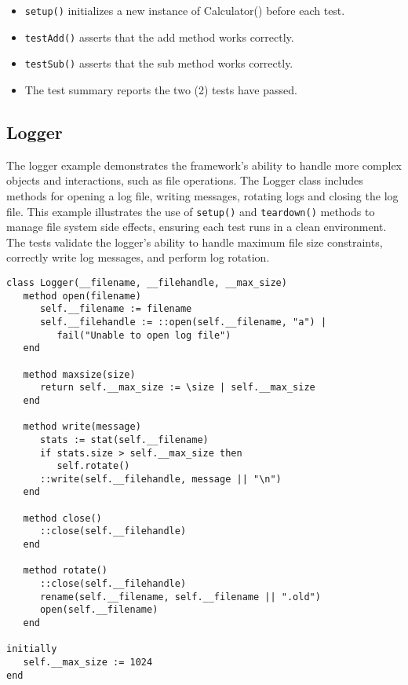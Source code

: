 \documentclass[letterpaper,12pt]{article}
\begin{document}
\begin{itemize}
   \item \texttt{setup()} initializes a new instance of Calculator() before each test.
   \item \texttt{testAdd()} asserts that the add method works correctly.
   \item \texttt{testSub()} asserts that the sub method works correctly.
   \item The test summary reports the two (2) tests have passed.
\end{itemize}

\newpage\subsection{Logger}

The logger example demonstrates the framework's ability to handle more complex objects and interactions, such as file operations. The Logger class includes methods for opening a log file, writing messages, rotating logs and closing the log file. This example illustrates the use of \texttt{setup()} and \texttt{teardown()} methods to manage file system side effects, ensuring each test runs in a clean environment. The tests validate the logger's ability to handle maximum file size constraints, correctly write log messages, and perform log rotation.

\bigskip{}
\begin{verbatim}
class Logger(__filename, __filehandle, __max_size)
   method open(filename)
      self.__filename := filename
      self.__filehandle := ::open(self.__filename, "a") | 
         fail("Unable to open log file")
   end

   method maxsize(size)
      return self.__max_size := \size | self.__max_size
   end

   method write(message)
      stats := stat(self.__filename)
      if stats.size > self.__max_size then
         self.rotate()
      ::write(self.__filehandle, message || "\n")
   end

   method close()
      ::close(self.__filehandle)
   end

   method rotate()
      ::close(self.__filehandle)
      rename(self.__filename, self.__filename || ".old")
      open(self.__filename)
   end

initially
   self.__max_size := 1024
end
\end{verbatim}
\end{document}
